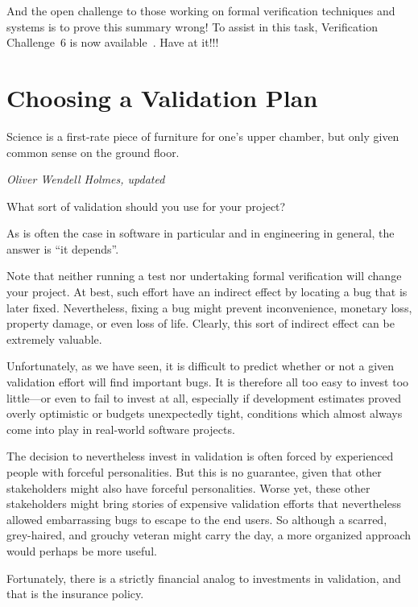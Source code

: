 And the open challenge to those working on formal verification techniques
and systems is to prove this summary wrong!
To assist in this task, Verification Challenge~6 is now
available~\cite{PaulEMcKenney2017VerificationChallenge6}.
Have at it!!!

\section{Choosing a Validation Plan}
\label{sec:formal:Choosing a Validation Plan}
%
\epigraph{Science is a first-rate piece of furniture for one's upper
	  chamber, but only given common sense on the ground floor.}
	 {\emph{Oliver Wendell Holmes, updated}}

What sort of validation should you use for your project?

As is often the case in software in particular and in engineering
in general, the answer is ``it depends''.

Note that neither running a test nor undertaking formal verification
will change your project.
At best, such effort have an indirect effect by locating a bug that
is later fixed.
Nevertheless, fixing a bug might prevent inconvenience, monetary loss,
property damage, or even loss of life.
Clearly, this sort of indirect effect can be extremely valuable.

Unfortunately, as we have seen, it is difficult to predict whether or
not a given validation effort will find important bugs.
It is therefore all too easy to invest too little---or even to fail
to invest at all, especially if development estimates proved overly
optimistic or budgets unexpectedly tight, conditions which almost
always come into play in real-world software projects.

The decision to nevertheless invest in validation is often forced by
experienced people with forceful personalities.
But this is no guarantee, given that other stakeholders might also
have forceful personalities.
Worse yet, these other stakeholders might bring stories of expensive
validation efforts that nevertheless allowed embarrassing bugs to
escape to the end users.
So although a scarred, grey-haired, and grouchy veteran might carry
the day, a more organized approach would perhaps be more useful.

Fortunately, there is a strictly financial analog to investments in
validation, and that is the insurance policy.



